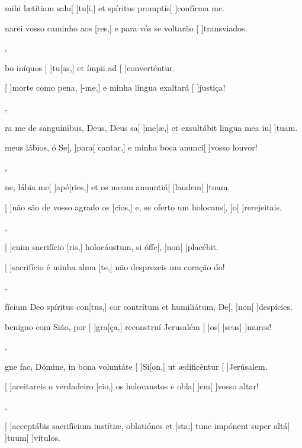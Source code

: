 {  {\item {} mihi lætítiam salu[ ]{tu}[i,] et spíritus promptís[ ]{con}{fírma} me.~\Antiphona}%
    {\item {}narei vosso caminho aos [res,] e para vós se voltarão [ ]{trans}{vi}{a}dos.~\Antiphona},
  {\item {}bo iníquos [ ]{tu}[as,] et ímpii ad [ ]{con}{ver}{tén}{\-tur.}~\Antiphona}%
    {\item {}[ ]{mor}te como pena, [-me,] e minha língua exaltará [ ]{jus}{ti}ça!~\Antiphona},
  {\item {}ra me de sanguínibus, Deus, Deus sa[ ]{me}[\-æ,] et exsultábit lingua mea iu[ ]{tu}am.~\Antiphona}%
    {\item {} meus lábios, ó Se[, ]{pa}{ra}[ cantar,] e minha boca anunci[ ]{vos}{so lou}vor!~\Antiphona},
  {\item {}ne, lábia me[ ]{a}{pé}[ries,] et os meum annuntiá[ ]{lau}{dem}[ ]{tu}am.~\Antiphona}%
    {\item {}[ ]{não} são de vosso agrado os [cios,] e, se oferto um holocaus[, ]{o}[ ]{re}{rejei}tais.~\Antiphona},
  {\item {}[ ]{e}nim sacrifício [ris,] holocáustum, si óffe[, ]{non}[ ]{pla}{cé}bit.~\Antiphona}%
    {\item {}[ ]{sa}crifício é minha alma [te,] não desprezeis um coração do!~\Antiphona},
  {\item {}fícium Deo spíritus con[tus,] cor contrítum et humiliátum, De[, ]{non}[ ]{de}{spíci}es.~\Antiphona}%
    {\item {} benigno com Sião, por [ ]{gra}[ça,] reconstruí Jerusalém [ ]{os}[ ]{seus}[ ]{mu}ros!~\Antiphona},
  {\item {}gne fac, Dómine, in bona voluntáte [ ]{Si}[\-on,] ut ædificéntur [ ]{Je}{rúsa}lem.~\Antiphona}%
    {\item {}[ ]{a}ceitareis o verdadeiro [cio,] os holocaustos e obla[ ]{em}[ ]{vos}{so al}tar!~\Antiphona},
  {\item {}[ ]{ac}ceptábis sacrifícium iustítiæ, oblatiónes et [\-sta;] tunc impónent super altá[ ]{tu}{um}[ ]{vítu}\-los.~\Antiphona}%
    {~\Antiphona}
}